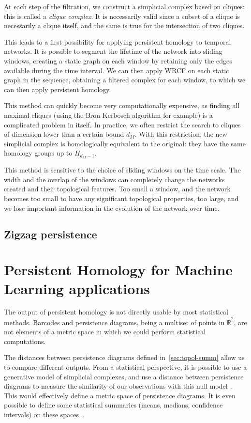 \documentclass[a4paper,11pt,openany,extrafontsizes]{memoir}
\begin{document}
At each step of the filtration, we construct a simplicial complex
based on cliques: this is called a \emph{clique complex}. It is
necessarily valid since a subset of a clique is necessarily a clique
itself, and the same is true for the intersection of two cliques.

This leads to a first possibility for applying persistent homology to
temporal networks. It is possible to segment the lifetime of the
network into sliding windows, creating a static graph on each window
by retaining only the edges available during the time interval. We can
then apply WRCF on each static graph in the sequence, obtaining a
filtered complex for each window, to which we can then apply
persistent homology.

This method can quickly become very computationally expensive, as
finding all maximal cliques (using the Bron-Kerbosch algorithm for
example) is a complicated problem in itself. In practice, we often
restrict the search to cliques of dimension lower than a certain bound
$d_M$. With this restriction, the new simplicial complex is
homologically equivalent to the original: they have the same homology
groups up to $H_{d_M-1}$.

This method is sensitive to the choice of sliding windows on the time
scale. The width and the overlap of the windows can completely change
the networks created and their topological features. Too small a
window, and the network becomes too small to have any significant
topological properties, too large, and we lose important information
in the evolution of the network over time.

\section{Zigzag persistence}%
\label{sec:zigzag-persistence}



\chapter{Persistent Homology for Machine Learning applications}%
\label{cha:pers-homol-mach}

The output of persistent homology is not directly usable by most
statistical methods. Barcodes and persistence diagrams, being a
multiset of points in $\overline{\mathbb{R}}^2$, are not elements of a
metric space in which we could perform statistical computations.

The distances between persistence diagrams defined
in~\autoref{sec:topol-summ} allow us to compare different
outputs. From a statistical perspective, it is possible to use a
generative model of simplicial complexes, and use a distance between
persistence diagrams to measure the similarity of our observations
with this null model~\cite{adler_persistent_2010}. This would
effectively define a metric space of persistence diagrams. It is even
possible to define some statistical summaries (means, medians,
confidence intervals) on these
spaces~\cite{turner_frechet_2014,munch_probabilistic_2015}.
\end{document}
